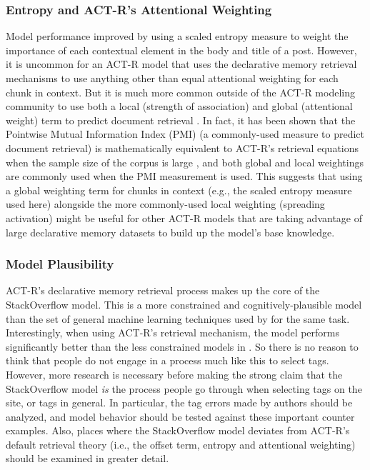 \documentclass[10pt,letterpaper]{article}
\begin{document}
\subsubsection{Entropy and ACT-R's Attentional Weighting}

Model performance improved by using a scaled entropy measure to weight the importance of each contextual element in the body and title of a post.
However, it is uncommon for an ACT-R model that uses the declarative memory retrieval mechanisms to use anything other than equal attentional weighting for each chunk in context.
But it is much more common outside of the ACT-R modeling community to use both a local (strength of association) and global (attentional weight) term to predict document retrieval \cite{Dumais1991}.
In fact, it has been shown that the Pointwise Mutual Information Index (PMI) (a commonly-used measure to predict document retrieval)
is mathematically equivalent to ACT-R's retrieval equations when the sample size of the corpus is large \cite{Budiu2007, Farahat2004},
and both global and local weightings are commonly used when the PMI measurement is used.
This suggests that using a global weighting term for chunks in context (e.g., the scaled entropy measure used here)
alongside the more commonly-used local weighting (spreading activation) might be useful for other ACT-R models that are taking advantage of large declarative memory datasets to build up the model's base knowledge.

\subsubsection{Model Plausibility}

ACT-R's declarative memory retrieval process makes up the core of the StackOverflow model.
This is a more constrained and cognitively-plausible model than the set of general machine learning techniques used by  for the same task. 
Interestingly, when using ACT-R's retrieval mechanism, the model performs significantly better than the less constrained models in .
So there is no reason to think that people do not engage in a process much like this to select tags.
However, more research is necessary before making the strong claim that the StackOverflow model \emph{is} the process people go through when selecting tags on the site, or tags in general.
In particular, the tag errors made by authors should be analyzed, and model behavior should be tested against these important counter examples.
Also, places where the StackOverflow model deviates from ACT-R's default retrieval theory (i.e., the offset term, entropy and attentional weighting) should be examined in greater detail.
\end{document}
